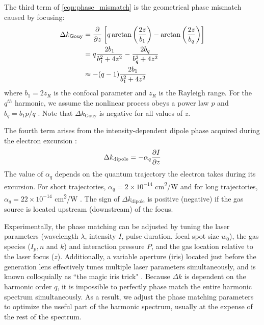 The third term of \cref{eqn:phase_mismatch} is the geometrical phase mismatch caused by focusing:
\begin{align}
\Delta k_{\textrm{Gouy}} &= \pdv{z} \left[ q \arctan\left( \frac{2 z}{b_1} \right) - \arctan \left( \frac{2 z}{b_q} \right) \right] \nonumber \\
&= q \frac{2 b_1}{b_1^2 + 4 z^2} - \frac{2 b_q}{b_q^2 + 4 z^2} \nonumber \\
&\approx -(q-1) \frac{2 b_1}{b_1^2 + 4 z^2}
\end{align}
where $b_1 = 2 z_R$ is the confocal parameter and $z_R$ is the Rayleigh range. For the $q^{th}$ harmonic, we assume the nonlinear process obeys a power law $p$ and $b_q = b_1 p /q$ \cite{schounAttosecondHighHarmonicSpectroscopy2015}. Note that $\Delta k_{\textrm{Gouy}}$ is negative for all values of $z$.

The fourth term arises from the intensity-dependent dipole phase acquired during the electron excursion \cite{lewensteinTheoryHighharmonicGeneration1994,balcouGeneralizedPhasematchingConditions1997,salieresCoherenceControlHighOrder1995}:
\begin{equation}
\Delta k_{\textrm{dipole}} = - \alpha_q \pdv{I}{z}
\label{eqn:deltak_atomic}
\end{equation}
The value of $\alpha_q$ depends on the quantum trajectory the electron takes during its excursion. For short trajectories, {$\alpha_q = 2 \times 10^{-14}$ cm\textsuperscript{2}/W} and for long trajectories, {$\alpha_q = 22 \times 10^{-14}$ cm\textsuperscript{2}/W} \cite{kazamiasPressureinducedPhaseMatching2011,balcouQuantumpathAnalysisPhase1999}. The sign of $\Delta k_{\textrm{dipole}}$ is positive (negative) if the gas source is located upstream (downstream) of the focus.

Experimentally, the phase matching can be adjusted by tuning the laser parameters (wavelength $\lambda$, intensity $I$, pulse duration, focal spot size $w_0$), the gas species ($I_p, n$ and $k$) and interaction pressure $P$, and the gas location relative to the laser focus ($z$). Additionally, a variable aperture (iris) located just before the generation lens effectively tunes multiple laser parameters simultaneously, and is known colloquially as ``the magic iris trick" \cite{kazamiasHighOrderHarmonic2002}. Because $\Delta k$ is dependent on the harmonic order $q$, it is impossible to perfectly phase match the entire harmonic spectrum simultaneously. As a result, we adjust the phase matching parameters to optimize the useful part of the harmonic spectrum, usually at the expense of the rest of the spectrum.

